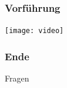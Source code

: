 \documentclass{beamer}
\begin{document}
\begin{frame}
\frametitle{Vorführung} 
\begin{center}
 \texttt{[image: video]} 
\end{center}

\end{frame}


\begin{frame}
\frametitle{Ende}
\fontsize{70pt}{70pt} \selectfont Fragen
\end{frame}
\end{document}
